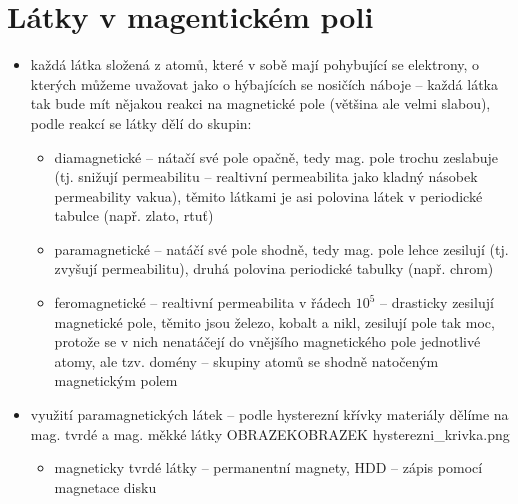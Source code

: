 \documentclass{article}
\begin{document}
\section{Látky v magentickém poli}
\begin{itemize}
  \item každá látka složená z atomů, které v sobě mají pohybující se elektrony, o kterých můžeme uvažovat jako o hýbajících se nosičích náboje -- každá látka tak bude mít nějakou reakci na magnetické pole (většina ale velmi slabou), podle reakcí se látky dělí do skupin:
  \begin{itemize}
    \item diamagnetické -- nátačí své pole opačně, tedy mag. pole trochu zeslabuje (tj. snižují permeabilitu -- realtivní permeabilita jako kladný násobek permeability vakua), těmito látkami je asi polovina látek v periodické tabulce (např. zlato, rtuť)
    \item paramagnetické -- natáčí své pole shodně, tedy mag. pole lehce zesilují (tj. zvyšují permeabilitu), druhá polovina periodické tabulky (např. chrom)
    \item feromagnetické -- realtivní permeabilita v řádech $10^5$ -- drasticky zesilují magnetické pole, těmito jsou železo, kobalt a nikl, zesilují pole tak moc, protože se v nich nenatáčejí do vnějšího magnetického pole jednotlivé atomy, ale tzv. domény -- skupiny atomů se shodně natočeným magnetickým polem
  \end{itemize}
  \item využití paramagnetických látek -- podle hysterezní křívky materiály dělíme na mag. tvrdé a mag. měkké látky OBRAZEKOBRAZEK hysterezni\_krivka.png
  \begin{itemize}
    \item magneticky tvrdé látky -- permanentní magnety, HDD -- zápis pomocí magnetace disku
  \end{itemize}
\end{itemize}
\end{document}
